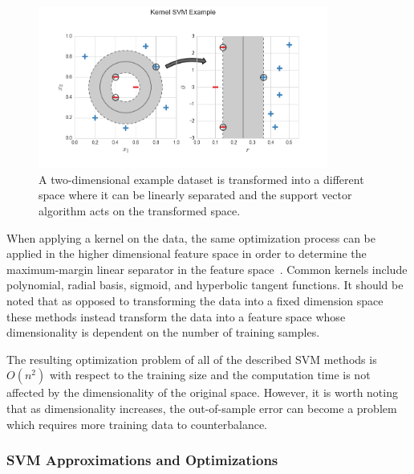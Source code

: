 \begin{figure}[!ht]
  \centering
  \includegraphics[width=0.85\textwidth]{figs/chap3/kernelSvmExample}
  \caption[Kernel Support Vector Machine Example]{A two-dimensional example dataset is transformed into a different space where it can be linearly separated and the support vector algorithm acts on the transformed space.}
  \label{fig:kernelSvmExample}
\end{figure}

When applying a kernel on the data, the same optimization process can be applied in the higher dimensional feature space in order to determine the maximum-margin linear separator in the feature space~\cite{BoserGuyonVapnik1992}.
%
Common kernels include polynomial, radial basis, sigmoid, and hyperbolic tangent functions.
%
It should be noted that as opposed to transforming the data into a fixed dimension space these methods instead transform the data into a feature space whose dimensionality is dependent on the number of training samples.

The resulting optimization problem of all of the described SVM methods is $O(n^2)$ with respect to the training size and the computation time is not affected by the dimensionality of the original space.
%
However, it is worth noting that as dimensionality increases, the out-of-sample error can become a problem which requires more training data to counterbalance.

\subsubsection{SVM Approximations and Optimizations}

